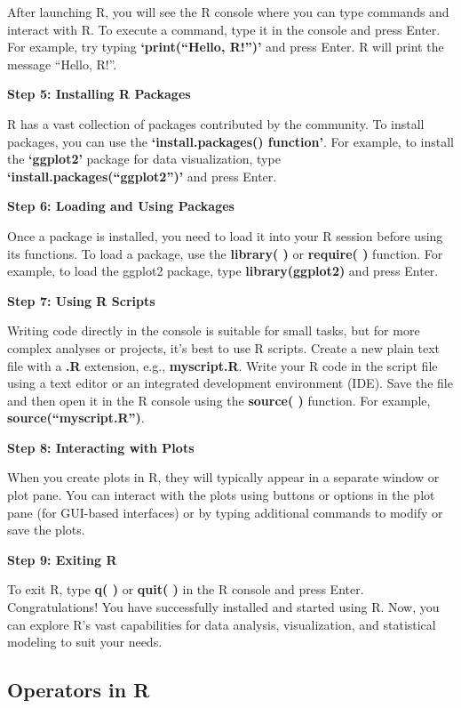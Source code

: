 \documentclass[
]{article}
\begin{document}
After launching R, you will see the R console where you can type
commands and interact with R. To execute a command, type it in the
console and press Enter. For example, try typing \textbf{`print(``Hello,
R!'')'} and press Enter. R will print the message ``Hello, R!''.

\textbf{Step 5: Installing R Packages}

R has a vast collection of packages contributed by the community. To
install packages, you can use the \textbf{`install.packages()
function'}. For example, to install the \textbf{`ggplot2'} package for
data visualization, type \textbf{`install.packages(``ggplot2'')'} and
press Enter.

\textbf{Step 6: Loading and Using Packages}

Once a package is installed, you need to load it into your R session
before using its functions. To load a package, use the \textbf{library(
)} or \textbf{require( )} function. For example, to load the ggplot2
package, type \textbf{library(ggplot2)} and press Enter.

\textbf{Step 7: Using R Scripts}

Writing code directly in the console is suitable for small tasks, but
for more complex analyses or projects, it's best to use R scripts.
Create a new plain text file with a \textbf{.R} extension, e.g.,
\textbf{myscript.R}. Write your R code in the script file using a text
editor or an integrated development environment (IDE). Save the file and
then open it in the R console using the \textbf{source( )} function. For
example, \textbf{source(``myscript.R'')}.

\textbf{Step 8: Interacting with Plots}

When you create plots in R, they will typically appear in a separate
window or plot pane. You can interact with the plots using buttons or
options in the plot pane (for GUI-based interfaces) or by typing
additional commands to modify or save the plots.

\textbf{Step 9: Exiting R}

To exit R, type \textbf{q( )} or \textbf{quit( )} in the R console and
press Enter. Congratulations! You have successfully installed and
started using R. Now, you can explore R's vast capabilities for data
analysis, visualization, and statistical modeling to suit your needs.

\hypertarget{operators-in-r}{%
\subsection{Operators in R}\label{operators-in-r}}
\end{document}
